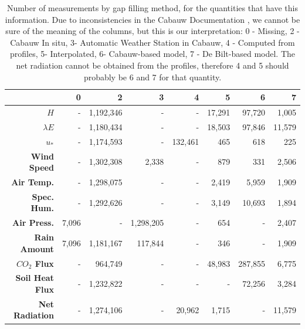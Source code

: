 \documentclass[12pt]{book}
\begin{document}
\begin{table}[]
\centering
\caption{Number of measurements by gap filling method, for the quantities that have this information. Due to inconsistencies in the Cabauw Documentation \citep{cabauw_gapfilling}, we cannot be sure of the meaning of the columns, but this is our interpretation: 0 - Missing, 2 - Cabauw In situ, 3- Automatic Weather Station in Cabauw, 4 - Computed from profiles, 5- Interpolated, 6- Cabauw-based model, 7 - De Bilt-based model. The net radiation cannot be obtained from the profiles, therefore 4 and 5 should probably be 6 and 7 for that quantity.}
\label{tbl:col_gapfilled}
\begin{tabular}{r|rrrrrrr}
& \textbf{0} & \textbf{2} & \textbf{3} & \textbf{4} & \textbf{5}  & \textbf{6}  & \textbf{7} \\ \hline
\textbf{$H$} & - &  1,192,346 & - & - &  17,291 &  97,720 &  1,005 \\
\textbf{$\lambda E$} & - &  1,180,434 & - & - &  18,503 &  97,846 &  11,579 \\
\textbf{$u_*$} & - &  1,174,593 & - &  132,461 &  465 &  618 &  225 \\
\textbf{Wind Speed} & - &  1,302,308 &  2,338 & - &  879 &  331 &  2,506 \\
\textbf{Air Temp.} & - &  1,298,075 & - & - &  2,419 &  5,959 &  1,909 \\
\textbf{Spec. Hum.} & - &  1,292,626 & - & - &  3,149 &  10,693 &  1,894 \\
\textbf{Air Press.} &  7,096 & - &  1,298,205 & - &  654 & - &  2,407 \\
\textbf{Rain Amount} &  7,096 &  1,181,167 &  117,844 & - &  346 & - &  1,909 \\
\textbf{$CO_2$ Flux} & - &  964,749 & - & - &  48,983 &  287,855 &  6,775 \\
\textbf{Soil Heat Flux} & - &  1,232,822 & - & - & - &  72,256 &  3,284 \\
\textbf{Net Radiation} & - &  1,274,106 & -&  20,962 &  1,715 & - &  11,579 \\
\end{tabular} 
\end{table}
\end{document}
